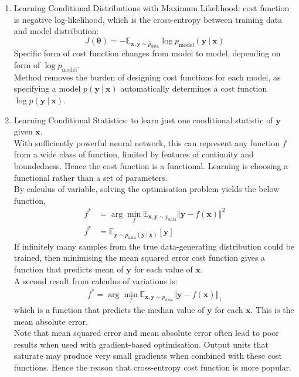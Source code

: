 \begin{definition} 
\begin{enumerate}[label=\roman*.]
\setlength{\itemsep}{0pt}
\item Learning Conditional Distributions with Maximum Likelihood: cost function is negative log-likelihood, which is the cross-entropy between training data and model distribution:
\begin{equation}
J(\bm{\theta}) = - \mathbb{E}_{\bm{x}, \bm{y} \sim \hat{p}_{\text{data}}} \log p_{\text{model}}(\bm{y} \ \vert \ \bm{x}) \nonumber
\end{equation}
Specific form of cost function changes from model to model, depending on form of $\log p_{\text{model}}$.\\
Method removes the burden of designing cost functions for each model, as specifying a model $p(\bm{y} \ \vert \ \bm{x})$ automatically determines a cost function $\log p(\bm{y} \ \vert \ \bm{x})$.
\item Learning Conditional Statistics: to learn just one conditional statistic of $\bm{y}$ given $\bm{x}$.\\
With sufficiently powerful neural network, this can represent any function $f$ from a wide class of function, limited by features of continuity and boundedness. Hence the cost function is a functional. Learning is choosing a functional rather than a set of parameters.\\
By calculus of variable, solving the optimisation problem yields the below function,
\begin{align}
f^* &= \arg \min_f \mathbb{E}_{\bm{x}, \bm{y} \sim p_{\text{data}}} \Vert \bm{y} - f(\bm{x}) \Vert^2 \nonumber \\
f^* &= \mathbb{E}_{\bm{y} \sim p_{\text{data}}(\bm{y} \ \vert \ \bm{x})} [\bm{y}] \nonumber
\end{align}
If infinitely many samples from the true data-generating distribution could be trained, then minimising the mean squared error cost function gives a function that predicts mean of $\bm{y}$ for each value of $\bm{x}$.\\
A second result from calculus of variations is:
\begin{align}
f^* = \arg \min_f \mathbb{E}_{\bm{x}, \bm{y} \sim p_{\text{data}}} \Vert \bm{y} - f(\bm{x}) \Vert_1 \nonumber
\end{align}
which is a function that predicts the median value of $\bm{y}$ for each $\bm{x}$. This is the mean absolute error.\\
Note that mean squared error and mean absolute error often lead to poor results when used with gradient-based optimisation. Output units that saturate may produce very small gradients when combined with these cost functions. Hence the reason that cross-entropy cost function is more popular.
\end{enumerate}
\end{definition}

